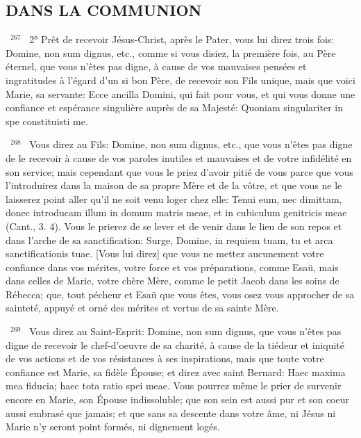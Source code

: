 \documentclass[paper=a5,pagesize=pdftex,fontsize=15pt,headinclude=on,twoside=off]{scrbook}
\newcommand{\negphantom}[1]{\settowidth{\dimen0}{#1}\hspace*{-\dimen0}}
\newcommand{\versenb}[1]{\par \vspace{10pt}~\negphantom{~${}^{#1}$~}${}^{#1}$~}
\begin{document}
\subsection{DANS LA COMMUNION}
\versenb{267} 2° Prêt de recevoir Jésus-Christ, après le Pater, vous lui direz trois fois: Domine, non sum dignus, etc.,
comme si vous disiez, la première fois, au Père éternel, que vous n'êtes pas digne, à cause de vos mauvaises
pensées et ingratitudes à l'égard d'un si bon Père, de recevoir son Fils unique, mais que voici Marie, sa servante:
Ecce ancilla Domini, qui fait pour vous, et qui vous donne une confiance et espérance singulière auprès de sa
Majesté: Quoniam singulariter in spe constituisti me.
\versenb{268} Vous direz au Fils: Domine, non sum dignus, etc., que vous n'êtes pas digne de le recevoir à cause de vos
paroles inutiles et mauvaises et de votre infidélité en son service; mais cependant que vous le priez d'avoir pitié de
vous parce que vous l'introduirez dans la maison de sa propre Mère et de la vôtre, et que vous ne le laisserez
point aller qu'il ne soit venu loger chez elle: Tenui eum, nec dimittam, donec introducam illum in domum matris
meae, et in cubiculum genitricis meae (Cant., 3. 4). Vous le prierez de se lever et de venir dans le lieu de son
repos et dans l'arche de sa sanctification: Surge, Domine, in requiem tuam, tu et arca sanctificationis tuae. [Vous
lui direz] que vous ne mettez aucunement votre confiance dans vos mérites, votre force et vos préparations,
comme Esaü, mais dans celles de Marie, votre chère Mère, comme le petit Jacob dans les soins de Rébecca; que,
tout pécheur et Esaü que vous êtes, vous osez vous approcher de sa sainteté, appuyé et orné des mérites et
vertus de sa sainte Mère.
\versenb{269} Vous direz au Saint-Esprit: Domine, non sum dignus, que vous n'êtes pas digne de recevoir le chef-d'oeuvre
de sa charité, à cause de la tiédeur et iniquité de vos actions et de vos résistances à ses inspirations, mais que
toute votre confiance est Marie, sa fidèle Épouse; et direz avec saint Bernard: Haec maxima mea fiducia; haec tota
ratio spei meae. Vous pourrez même le prier de survenir encore en Marie, son Épouse indissoluble; que son sein
est aussi pur et son coeur aussi embrasé que jamais; et que sans sa descente dans votre âme, ni Jésus ni Marie
n'y seront point formés, ni dignement logés.
\end{document}
